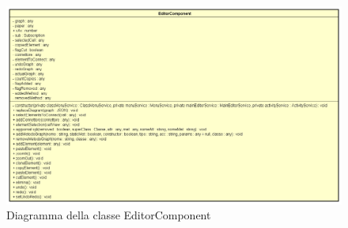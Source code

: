 \begin{figure}[h!]
	\centering
	\includegraphics[scale=0.8]{res/sections/SpecificaFrontEnd/Components/Disegnetti/editor.png}
	\caption{Diagramma della classe EditorComponent}
\end{figure}

